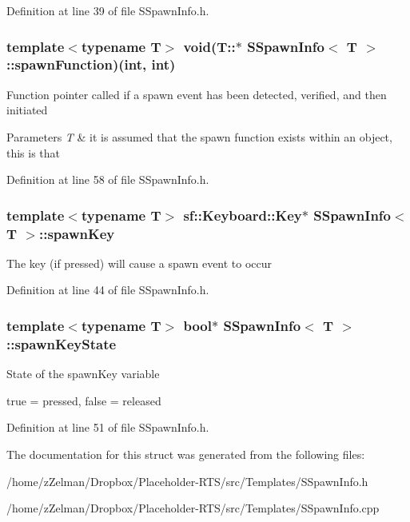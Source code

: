 Definition at line 39 of file S\-Spawn\-Info.\-h.

\hypertarget{structSSpawnInfo_af73182a1abe40cbfc6d20c8d49e68caa}{
\subsubsection[{spawn\-Function}]{\setlength{\rightskip}{0pt plus 5cm}template$<$typename T$>$ void(T\-::$\ast$ {\bf S\-Spawn\-Info}$<$ T $>$\-::spawn\-Function)(int, int)}}\label{structSSpawnInfo_af73182a1abe40cbfc6d20c8d49e68caa}
Function pointer called if a spawn event has been detected, verified, and then initiated


\begin{DoxyParams}{Parameters}
{\em T} & it is assumed that the spawn function exists within an object, this is that \\
\hline
\end{DoxyParams}


Definition at line 58 of file S\-Spawn\-Info.\-h.

\hypertarget{structSSpawnInfo_ac3dd746c7d07309d2c8a42aa6841e0ce}{
\subsubsection[{spawn\-Key}]{\setlength{\rightskip}{0pt plus 5cm}template$<$typename T$>$ {\bf sf\-::\-Keyboard\-::\-Key}$\ast$ {\bf S\-Spawn\-Info}$<$ T $>$\-::spawn\-Key}}\label{structSSpawnInfo_ac3dd746c7d07309d2c8a42aa6841e0ce}
The key (if pressed) will cause a spawn event to occur 

Definition at line 44 of file S\-Spawn\-Info.\-h.

\hypertarget{structSSpawnInfo_aa29b90107ad7e0d6de9eecf5abf4193b}{
\subsubsection[{spawn\-Key\-State}]{\setlength{\rightskip}{0pt plus 5cm}template$<$typename T$>$ bool$\ast$ {\bf S\-Spawn\-Info}$<$ T $>$\-::spawn\-Key\-State}}\label{structSSpawnInfo_aa29b90107ad7e0d6de9eecf5abf4193b}
State of the spawn\-Key variable

true = pressed, false = released 

Definition at line 51 of file S\-Spawn\-Info.\-h.



The documentation for this struct was generated from the following files\-:\begin{DoxyCompactItemize}
\item 
/home/z\-Zelman/\-Dropbox/\-Placeholder-\/\-R\-T\-S/src/\-Templates/S\-Spawn\-Info.\-h\item 
/home/z\-Zelman/\-Dropbox/\-Placeholder-\/\-R\-T\-S/src/\-Templates/S\-Spawn\-Info.\-cpp\end{DoxyCompactItemize}
